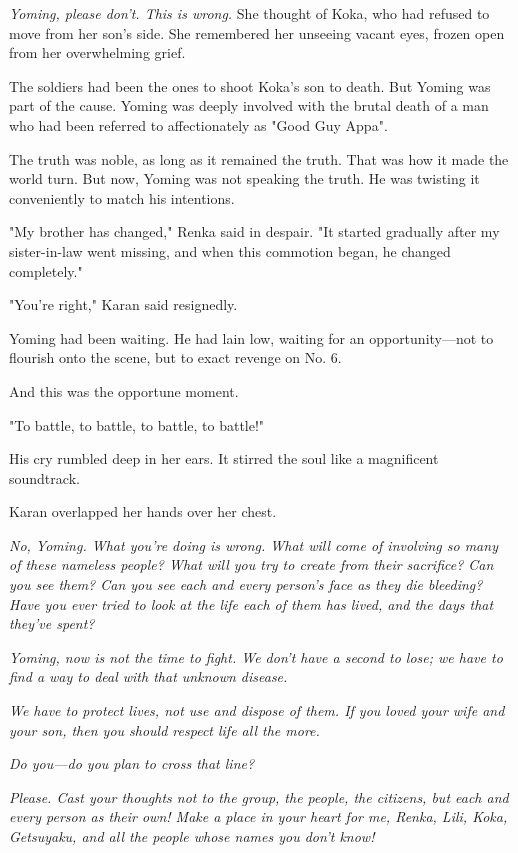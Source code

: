 \emph{Yoming, please don't. This is wrong.} She thought of Koka, who had
refused to move from her son's side. She remembered her unseeing vacant
eyes, frozen open from her overwhelming grief.

The soldiers had been the ones to shoot Koka's son to death. But Yoming
was part of the cause. Yoming was deeply involved with the brutal death
of a man who had been referred to affectionately as "Good Guy Appa".

The truth was noble, as long as it remained the truth. That was how it
made the world turn. But now, Yoming was not speaking the truth. He was
twisting it conveniently to match his intentions.

"My brother has changed," Renka said in despair. "It started gradually
after my sister-in-law went missing, and when this commotion began, he
changed completely."

"You're right," Karan said resignedly.

Yoming had been waiting. He had lain low, waiting for an opportunity---not
to flourish onto the scene, but to exact revenge on No. 6.

And this was the opportune moment.

"To battle, to battle, to battle, to battle!"

His cry rumbled deep in her ears. It stirred the soul like a magnificent
soundtrack.

Karan overlapped her hands over her chest.

\emph{No, Yoming. What you're doing is wrong. What will come of involving so
many of these nameless people? What will you try to create from their
sacrifice? Can you see them? Can you see each and every person's face as
they die bleeding? Have you ever tried to look at the life each of them
has lived, and the days that they've spent?}

\emph{Yoming, now is not the time to fight. We don't have a second to lose; we
have to find a way to deal with that unknown disease.}

\emph{We have to protect lives, not use and dispose of them. If you loved your
wife and your son, then you should respect life all the more.}

\emph{Do you---do you plan to cross that line?}

\emph{Please. Cast your thoughts not to the group, the people, the citizens,
but each and every person as their own! Make a place in your heart for
me, Renka, Lili, Koka, Getsuyaku, and all the people whose names you
don't know!}

